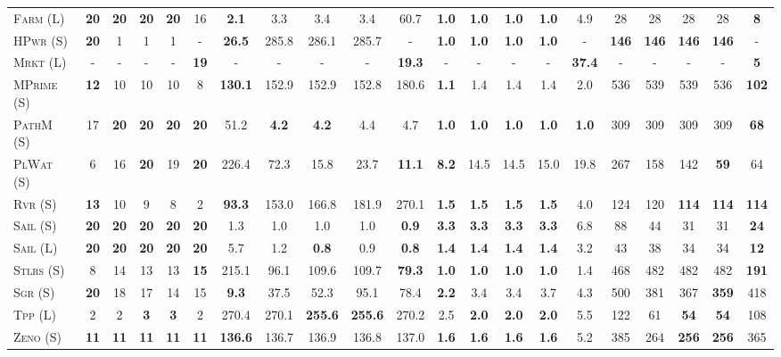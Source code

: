 \documentclass[11pt,landscape]{article}
\begin{document}
\begin{table}[tb]
{\begin{tabular}{|l||ccccc||ccccc||ccccc||ccccc||}
\textsc{Farm} (L)&\textbf{20}&\textbf{20}&\textbf{20}&\textbf{20}&16&\textbf{2.1}&3.3&3.4&3.4&60.7&\textbf{1.0}&\textbf{1.0}&\textbf{1.0}&\textbf{1.0}&4.9&28&28&28&28&\textbf{8}\\
\textsc{HPwr} (S)&\textbf{20}&1&1&1&-&\textbf{26.5}&285.8&286.1&285.7&-&\textbf{1.0}&\textbf{1.0}&\textbf{1.0}&\textbf{1.0}&-&\textbf{146}&\textbf{146}&\textbf{146}&\textbf{146}&-\\
\textsc{Mrkt} (L)&-&-&-&-&\textbf{19}&-&-&-&-&\textbf{19.3}&-&-&-&-&\textbf{37.4}&-&-&-&-&\textbf{5}\\
\textsc{MPrime} (S)&\textbf{12}&10&10&10&8&\textbf{130.1}&152.9&152.9&152.8&180.6&\textbf{1.1}&1.4&1.4&1.4&2.0&536&539&539&536&\textbf{102}\\
\textsc{PathM} (S)&17&\textbf{20}&\textbf{20}&\textbf{20}&\textbf{20}&51.2&\textbf{4.2}&\textbf{4.2}&4.4&4.7&\textbf{1.0}&\textbf{1.0}&\textbf{1.0}&\textbf{1.0}&\textbf{1.0}&309&309&309&309&\textbf{68}\\
\textsc{PlWat} (S)&6&16&\textbf{20}&19&\textbf{20}&226.4&72.3&15.8&23.7&\textbf{11.1}&\textbf{8.2}&14.5&14.5&15.0&19.8&267&158&142&\textbf{59}&64\\
\textsc{Rvr} (S)&\textbf{13}&10&9&8&2&\textbf{93.3}&153.0&166.8&181.9&270.1&\textbf{1.5}&\textbf{1.5}&\textbf{1.5}&\textbf{1.5}&4.0&124&120&\textbf{114}&\textbf{114}&\textbf{114}\\
\textsc{Sail} (S)&\textbf{20}&\textbf{20}&\textbf{20}&\textbf{20}&\textbf{20}&1.3&1.0&1.0&1.0&\textbf{0.9}&\textbf{3.3}&\textbf{3.3}&\textbf{3.3}&\textbf{3.3}&6.8&88&44&31&31&\textbf{24}\\
\textsc{Sail} (L)&\textbf{20}&\textbf{20}&\textbf{20}&\textbf{20}&\textbf{20}&5.7&1.2&\textbf{0.8}&0.9&\textbf{0.8}&\textbf{1.4}&\textbf{1.4}&\textbf{1.4}&\textbf{1.4}&3.2&43&38&34&34&\textbf{12}\\
\textsc{Stlrs} (S)&8&14&13&13&\textbf{15}&215.1&96.1&109.6&109.7&\textbf{79.3}&\textbf{1.0}&\textbf{1.0}&\textbf{1.0}&\textbf{1.0}&1.4&468&482&482&482&\textbf{191}\\
\textsc{Sgr} (S)&\textbf{20}&18&17&14&15&\textbf{9.3}&37.5&52.3&95.1&78.4&\textbf{2.2}&3.4&3.4&3.7&4.3&500&381&367&\textbf{359}&418\\
\textsc{Tpp} (L)&2&2&\textbf{3}&\textbf{3}&2&270.4&270.1&\textbf{255.6}&\textbf{255.6}&270.2&2.5&\textbf{2.0}&\textbf{2.0}&\textbf{2.0}&5.5&122&61&\textbf{54}&\textbf{54}&108\\
\textsc{Zeno} (S)&\textbf{11}&\textbf{11}&\textbf{11}&\textbf{11}&\textbf{11}&\textbf{136.6}&136.7&136.9&136.8&137.0&\textbf{1.6}&\textbf{1.6}&\textbf{1.6}&\textbf{1.6}&5.2&385&264&\textbf{256}&\textbf{256}&365\\

\end{tabular}}
\end{table}
\end{document}
